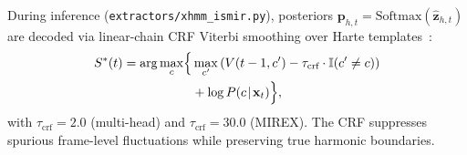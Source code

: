 \documentclass{article}
\begin{document}
During inference ({\small\texttt{extractors/xhmm\_ismir.py}}), posteriors $\mathbf{p}_{h,t} = \text{Softmax}(\hat{\mathbf{z}}_{h,t})$ are decoded via linear-chain CRF Viterbi smoothing over Harte templates~\cite{harte2005symbolic,akram2026chordformer}:
\begin{equation}\label{eq:viterbi_decoding}
  \begin{split}
    S^*(t) = \arg\max_{c} \Bigl\{ &\max_{c'} \left( V(t-1, c') - \tau_{\text{crf}} \cdot \mathbb{I}(c' \neq c) \right) \\
    &+ \log P(c \!\mid\! \mathbf{x}_t) \Bigr\},
  \end{split}
\end{equation}
with $\tau_{\text{crf}} = 2.0$ (multi-head) and $\tau_{\text{crf}} = 30.0$ (MIREX). The CRF suppresses spurious frame-level fluctuations while preserving true harmonic boundaries.
\end{document}
